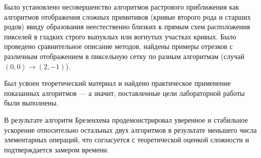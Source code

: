 \documentclass[a4paper,14pt]{extarticle}
\begin{document}
Было установлено несовершенство алгоритмов растрового приближения как алгоритмов отображения сложных примитивов (кривые второго рода и старших родов) ввиду образования неестественно близких к прямым схем расположения пикселей в гладких строго выпуклых или вогнутых участках кривых. Было проведено сравнительное описание методов, найдены примеры отрезков с различным отображением в пиксельную сетку по разным алгоритмам (случай $(0,0)\to(2,-1)$).

Был усвоен теоретический материал и найдено практическое применение показанных алгоритмов — а значит, поставленные цели лабораторной работы были выполнены.

В результате алгоритм Брезенхема продемонстрировал уверенное и стабильное ускорение относительно остальных двух алгоритмов в результате меньшего числа элементарных операций, что согласуется с теоретической оценкой сложности и подтверждается замером времени.
\end{document}
